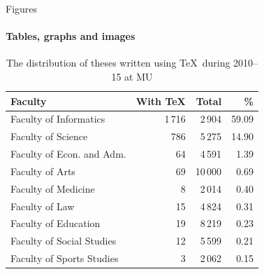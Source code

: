 \documentclass{beamer}
\begin{document}
  \begin{frame}[label=figs1]{Figures}
    \framesubtitle{Tables, graphs and images}
    \begin{table}[!b]
      {\carlitoTLF %
      \begin{tabularx}{\textwidth}{Xrrr}
        \textbf{Faculty} & \textbf{With \TeX} & \textbf{Total} &
        \textbf{\%} \\
        \toprule
        Faculty of Informatics       & 1\,716  & 2\,904  &
        59.09 \\%
        Faculty of Science           & 786     & 5\,275  &
        14.90 \\%
        Faculty of Econ. and Adm.    & 64      & 4\,591  &
        1.39  \\%
        Faculty of Arts              & 69      & 10\,000 &
        0.69  \\%
        Faculty of Medicine          & 8       & 2\,014  &
        0.40  \\%
        Faculty of Law               & 15      & 4\,824  &
        0.31  \\%
        Faculty of Education         & 19      & 8\,219  &
        0.23  \\%
        Faculty of Social Studies    & 12      & 5\,599  &
        0.21  \\%
        Faculty of Sports Studies    & 3       & 2\,062  &
        0.15  \\%
        \bottomrule
      \end{tabularx}}
      \caption{The distribution of theses written using \TeX\ during 2010--15 at MU}
    \end{table}
  \end{frame}
\end{document}
